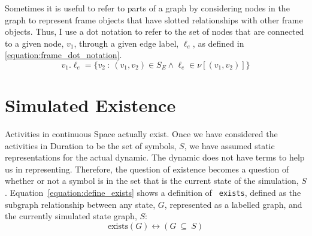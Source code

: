 Sometimes it is useful to refer to parts of a graph by considering
nodes in the graph to represent frame objects that have slotted
relationships with other frame objects.  Thus, I use a dot notation to
refer to the set of nodes that are connected to a given node, $v_1$,
through a given edge label, $\ell_e$, as defined in
{\mbox{\autoref{equation:frame_dot_notation}}}.
\begin{equation}
\label{equation:frame_dot_notation}
v_1.\ell_e = \{v_2 ~:~ (v_1, v_2) \in S_E \wedge \ell_e \in \nu[(v_1, v_2)]\}
\end{equation}

\section{Simulated Existence}

Activities in continuous Space actually exist.  Once we have
considered the activities in Duration to be the set of symbols, $S$,
we have assumed static representations for the actual dynamic.  The
dynamic does not have terms to help us in representing.  Therefore,
the question of existence becomes a question of whether or not a
symbol is in the set that is the current state of the simulation, $S$.
Equation~\ref{equation:define_exists} shows a definition of {\tt
  exists}, defined as the subgraph relationship between any state,
$G$, represented as a labelled graph, and the currently simulated
state graph, $S$:
\begin{equation}
\label{equation:define_exists}
\text{exists}(G) \longleftrightarrow (G ~{\subseteq}~ S)
\end{equation}





